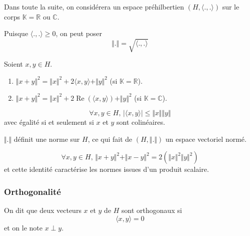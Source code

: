 	Dans toute la suite, on considérera un espace préhilbertien $(H, \langle ., . \rangle)$ sur le corps $\mathbb{K} = \mathbb{R} \text{ ou } \mathbb{C}$.

	\begin{notation}
		Puisque $\langle ., . \rangle \geq 0$, on peut poser
		\[ \Vert . \Vert = \sqrt{\langle ., . \rangle} \]
	\end{notation}

	\begin{proposition}
		\label{213-1}
		Soient $x, y \in H$.
		\begin{enumerate}[label=(\roman*)]
			\item $\Vert x + y \Vert^2 = \Vert x \Vert^2 + 2 \langle x, y \rangle + \Vert y \Vert^2$ (si $\mathbb{K} = \mathbb{R}$).
			\item $\Vert x + y \Vert^2 = \Vert x \Vert^2 + 2 \operatorname{Re}(\langle x, y \rangle) + \Vert y \Vert^2$ (si $\mathbb{K} = \mathbb{C}$).
		\end{enumerate}
	\end{proposition}

	\begin{theorem}
		\[ \forall x, y \in H, \, \vert \langle x, y \rangle \vert \leq \Vert x \Vert \Vert y \Vert \]
		avec égalité si et seulement si $x$ et $y$ sont colinéaires.
	\end{theorem}

	\begin{corollary}
		$\Vert . \Vert$ définit une norme sur $H$, ce qui fait de $(H, \Vert . \Vert)$ un espace vectoriel normé.
	\end{corollary}


	\begin{proposition}
		\[ \forall x, y \in H, \, \Vert x + y \Vert^2 + \Vert x - y \Vert^2 = 2(\Vert x \Vert^2 \Vert y \Vert^2) \]
		et cette identité caractérise les normes issues d'un produit scalaire.
	\end{proposition}

	\subsubsection{Orthogonalité}


	\begin{definition}
		On dit que deux vecteurs $x$ et $y$ de $H$ sont orthogonaux si
		\[ \langle x, y \rangle = 0 \]
		et on le note $x \perp y$.
	\end{definition}

